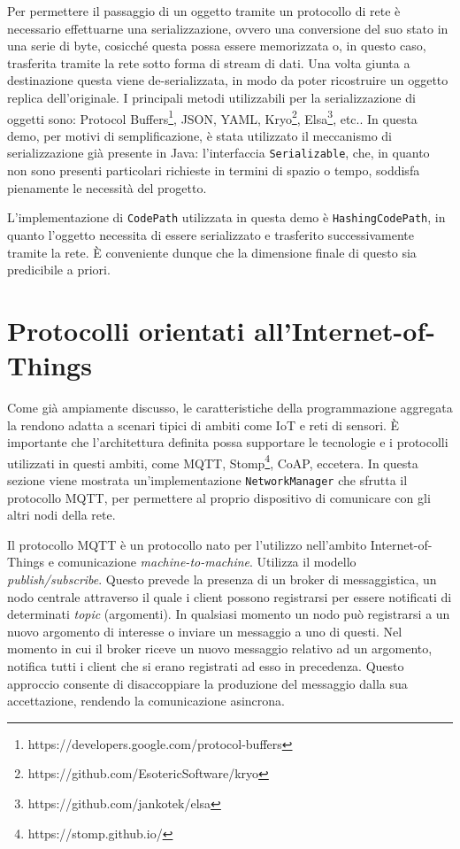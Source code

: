 Per permettere il passaggio di un oggetto tramite un protocollo di rete è
necessario effettuarne una serializzazione, ovvero una conversione del suo stato
in una serie di byte, cosicché questa possa essere memorizzata o, in questo
caso, trasferita tramite la rete sotto forma di stream di dati. Una volta giunta
a destinazione questa viene de-serializzata, in modo da poter ricostruire un
oggetto replica dell'originale. I principali metodi utilizzabili per la
serializzazione di oggetti sono: Protocol
Buffers\footnote{https://developers.google.com/protocol-buffers},
JSON\cite{rfc7159}, YAML\cite{ben2009yaml},
Kryo\footnote{https://github.com/EsotericSoftware/kryo},
Elsa\footnote{https://github.com/jankotek/elsa}, etc.. In questa demo, per
motivi di semplificazione, è stata utilizzato il meccanismo di serializzazione
già presente in Java: l'interfaccia \texttt{Serializable}, che, in quanto non
sono presenti particolari richieste in termini di spazio o tempo, soddisfa
pienamente le necessità del progetto.

L'implementazione di \texttt{CodePath} utilizzata in questa demo è
\texttt{HashingCodePath}, in quanto l'oggetto necessita di essere serializzato e
trasferito successivamente tramite la rete. È conveniente dunque che la
dimensione finale di questo sia predicibile a priori.

\section{Protocolli orientati all'Internet-of-Things}
Come già ampiamente discusso, le caratteristiche della programmazione aggregata
la rendono adatta a scenari tipici di ambiti come IoT e reti di sensori. È
importante che l'architettura definita possa supportare le tecnologie e i
protocolli utilizzati in questi ambiti, come MQTT\cite{shinde2016mqtt},
Stomp\footnote{https://stomp.github.io/},
CoAP\cite{rfc7252}, eccetera. In questa sezione viene mostrata
un'implementazione \texttt{NetworkManager} che sfrutta il protocollo MQTT, per
permettere al proprio dispositivo di comunicare con gli altri nodi della rete.

Il protocollo MQTT è un protocollo nato per l'utilizzo nell'ambito
Internet-of-Things e comunicazione \textit{machine-to-machine}. Utilizza il
modello \textit{publish/subscribe}. Questo prevede la presenza di un broker di
messaggistica, un nodo centrale attraverso il quale i client possono registrarsi
per essere notificati di determinati \textit{topic} (argomenti). In qualsiasi
momento un nodo può registrarsi a un nuovo argomento di interesse o inviare un
messaggio a uno di questi. Nel momento in cui il broker riceve un nuovo
messaggio relativo ad un argomento, notifica tutti i client che si erano
registrati ad esso in precedenza. Questo approccio consente di disaccoppiare la
produzione del messaggio dalla sua accettazione, rendendo la comunicazione
asincrona.

